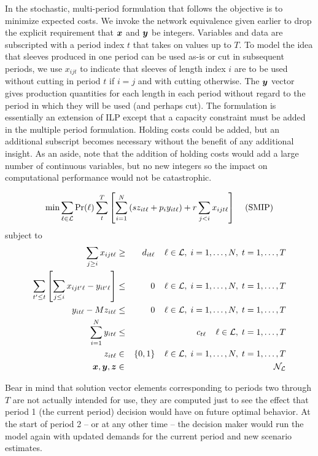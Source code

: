 In the stochastic, multi-period formulation that follows the objective
is to minimize expected costs.  We invoke the network equivalence
given earlier to drop the explicit requirement that $\mbox{{\boldmath $x$}}$ and
$\mbox{{\boldmath $y$}}$ be integers. Variables and data are subscripted with a
period index $t$ that takes on values up to $T$. To model the idea
that sleeves produced in one period can be used as-is or cut in
subsequent periods, we use $x_{ijt}$ to indicate that sleeves of
length index $i$ are to be used without cutting in period $t$ if $i=j$
and with cutting otherwise.  The $\mbox{{\boldmath $y$}}$ vector gives production
quantities for each length in each period without regard to the period
in which they will be used (and perhaps cut). The formulation is
essentially an extension of ILP except that a capacity constraint
must be added in the multiple period formulation. Holding costs could
be added, but an additional subscript becomes necessary without the
benefit of any additional insight. As an aside, note that the addition
of holding costs would add a large number of continuous variables, but
no new integers so the impact on computational performance would not
be catastrophic.

\[
\min\sum_{\ell\in{\cal L}}\mbox{Pr}(\ell)
     \sum_{t}^{T}\left[\sum_{i=1}^{N}\left(sz_{it\ell}+p_{i}y_{it\ell}\right)
    +r\sum_{j<i}x_{ijt\ell}\right] \;\;\;\;\mbox{(SMIP)}
\]
subject to
\begin{eqnarray}
\sum_{j \geq i}x_{ijt\ell} & \geq & d_{it\ell} 
          \;\;\;\; \ell \in {\cal L}, \; i=1,\ldots,N, \; t=1,\ldots,T \label{Dconstr} \\
\sum_{t'\leq t}\left[\sum_{j \leq i}x_{ijt'\ell} - y_{it'\ell}\right] & \leq & 0 
          \;\;\;\; \ell \in {\cal L}, \; i=1,\ldots,N, \; t=1,\ldots,T \label{Pconstr} \\
y_{it\ell} - Mz_{it\ell} & \leq & 0 
          \;\;\;\; \ell \in {\cal L}, \;i=1,\ldots,N, \; t=1,\ldots,T \label{Mconstr} \\
\sum_{i=1}^{N}y_{it\ell} & \leq & c_{t\ell}
          \;\;\;\; \ell \in {\cal L}, \; t=1,\ldots,T \label{Cconstr} \\
z_{it\ell} & \in & \{0,1\} 
          \;\;\;\; \ell \in {\cal L}, \; i=1,\ldots,N, \; t=1,\ldots,T \label{intconstr} \\
\mbox{{\boldmath $x$}}, \mbox{{\boldmath $y$}}, \mbox{{\boldmath $z$}} & \in & {\cal N}_{\cal L} 
\end{eqnarray}

Bear in mind that solution vector elements corresponding
to periods two through $T$ are not actually intended for use, they 
are computed just to see the effect that period 1 (the current period) 
decision would have on future optimal behavior. At the start of period 2 
-- or at any other time -- the decision maker would run the model again 
with updated demands for the current period and new scenario estimates.

